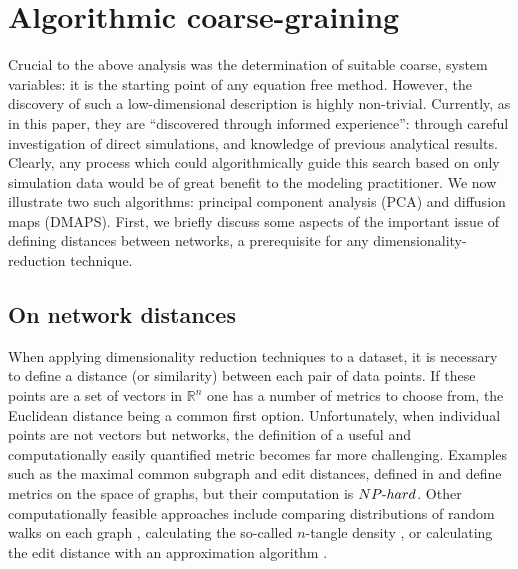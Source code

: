   \section{Algorithmic coarse-graining}
  \label{sec:dr}
  Crucial to the above analysis was the determination of suitable
  coarse, system variables: it is the starting point of any equation
  free method.
  However, the discovery of such a low-dimensional description is
  highly non-trivial.
  Currently, as in this paper, they are ``discovered through informed
  experience'': through careful investigation of direct simulations,
  and knowledge of previous analytical results.
  Clearly, any process which could algorithmically guide this search
  based on only simulation data would be of great benefit to the
  modeling practitioner.
  We now illustrate two such algorithms: principal component analysis
  (PCA) and diffusion maps (DMAPS).
  First, we briefly discuss some aspects of the important issue of
  defining distances between networks, a prerequisite for any
  dimensionality-reduction technique.

  \subsection{On network distances}

  When applying dimensionality reduction techniques to a dataset, it
  is necessary to define a distance (or similarity) between each pair
  of data points.
  If these points are a set of vectors in $\mathbb{R}^n$ one has a
  number of metrics to choose from, the Euclidean distance being a
  common first option.
  Unfortunately, when individual points are not vectors but networks,
  the definition of a useful and computationally easily quantified
  metric becomes far more challenging.
  Examples such as the maximal common subgraph and edit distances,
  defined in \cite{bunke_graph_1998} and \cite{gao_survey_2010} define
  metrics on the space of graphs, but their computation is
  $NP\textnormal{-}hard$.
  Other computationally feasible approaches include comparing
  distributions of random walks on each graph
  \cite{vishwanathan_graph_2010}, calculating the so-called $n$-tangle
  density \cite{gallos_revealing_2014}, or calculating the edit
  distance
  with an approximation algorithm \cite{riesen_approximate_2009,zeng_comparing_2009}.

